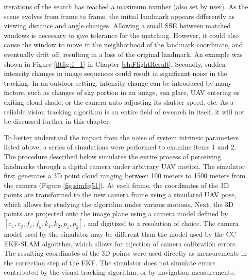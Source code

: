 \begin{enumerate}
  iterations of the search has reached a maximum number (also set by
  user). As the scene evolves from frame to frame, the initial
  landmark appears differently as viewing distance and angle changes.
  Allowing a small SSE between matched windows is necessary to give
  tolerance for the matching. However, it could also cause the window
  to move in the neighborhood of the landmark coordinate, and
  eventually drift off, resulting in a loss of the original landmark.
  An example was shown in Figure \ref{fltfig:1_1} in Chapter
  \ref{ch:FlightResult}. Secondly, sudden intensity changes in image
  sequences could result in significant noise in the tracking. In an
  outdoor setting, intensity change can be introduced by many factors,
  such as changes of sky portion in an image, sun glare, UAV entering
  or exiting cloud shade, or the camera auto-adjusting its shutter
  speed, etc. As a reliable vision tracking algorithm is an entire
  field of research in itself, it will not be discussed further in
  this chapter.

\end{enumerate}

To better understand the impact from the noise of system intrinsic
parameters listed above, a series of simulations were performed to
examine items 1 and 2. The procedure described below simulates the
entire process of perceiving landmarks through a digital camera under
arbitrary UAV motion. The simulator first generates a 3D point cloud
ranging between 100 meters to 1500 meters from the camera (Figure
\ref{fig:simfig51}). At each frame, the coordinates of the 3D points
are transformed to the new camera frame using a simulated UAV pose,
which allows for studying the algorithm under various motions. Next,
the 3D points are projected onto the image plane using a camera model
defined by $[c_{x}, c_{y}, f_{x}, f_{y}, k_{1}, k_{2}, p_{1}, p_{2}]$,
and digitized to a resolution of choice. The camera model used by the
simulator may be different than the model used by the CC-EKF-SLAM
algorithm, which allows for injection of camera calibration errors.
The resulting coordinates of the 3D points were used directly as
measurements in the correction step of the EKF. The simulator does not simulate 
errors contributed by the visual tracking algorithm, or by navigation
measurements.

